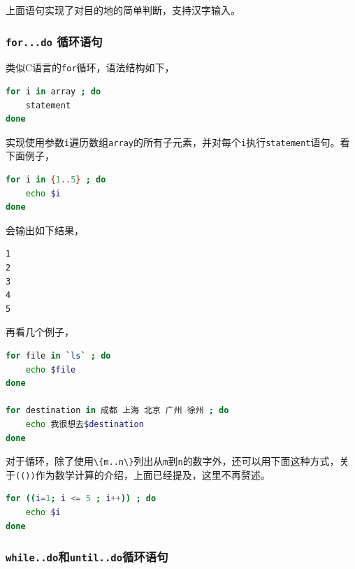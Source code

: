 \documentclass[doctor,openright,twoside]{sjtuthesis}
\newcommand{\passthrough}[1]{#1}
\theoremstyle{plain}
\theoremstyle{definition}
\theoremstyle{remark}
\theoremstyle{ocrenumbox}
\theoremstyle{plain}
\begin{document}
上面语句实现了对目的地的简单判断，支持汉字输入。

\hypertarget{for...do-}{%
\subsubsection{\texorpdfstring{\texttt{for...do}
循环语句}{for...do 循环语句}}\label{for...do-}}

类似C语言的\passthrough{\lstinline!for!}循环，语法结构如下，

\begin{lstlisting}[language=bash]
for i in array ; do
    statement
done
\end{lstlisting}

实现使用参数\passthrough{\lstinline!i!}遍历数组\passthrough{\lstinline!array!}的所有子元素，并对每个\passthrough{\lstinline!i!}执行\passthrough{\lstinline!statement!}语句。看下面例子，

\begin{lstlisting}[language=bash]
for i in {1..5} ; do
    echo $i
done
\end{lstlisting}

会输出如下结果，

\begin{lstlisting}[language=bash]
1
2
3
4
5
\end{lstlisting}

再看几个例子，

\begin{lstlisting}[language=bash]
for file in `ls` ; do
    echo $file
done

for destination in 成都 上海 北京 广州 徐州 ; do
    echo 我很想去$destination
done
\end{lstlisting}

对于循环，除了使用\passthrough{\lstinline!\{m..n\}!}列出从\passthrough{\lstinline!m!}到\passthrough{\lstinline!n!}的数字外，还可以用下面这种方式，关于\passthrough{\lstinline!(())!}作为数学计算的介绍，上面已经提及，这里不再赘述。

\begin{lstlisting}[language=bash]
for ((i=1; i <= 5 ; i++)) ; do
    echo $i
done
\end{lstlisting}

\hypertarget{while..dountil..do}{%
\subsubsection{\texorpdfstring{\texttt{while..do}和\texttt{until..do}循环语句}{while..do和until..do循环语句}}\label{while..dountil..do}}
\end{document}
